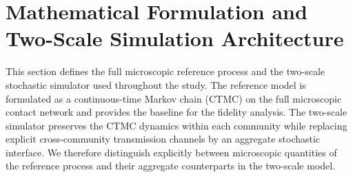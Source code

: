 \documentclass[a4paper,fleqn]{cas-sc}
\newif\ifDEBUG
\begin{document}


\section{Mathematical Formulation and Two-Scale Simulation Architecture}

This section defines the full microscopic reference process and the two-scale stochastic simulator used throughout the study. The reference model is formulated as a continuous-time Markov chain (CTMC) on the full microscopic contact network and provides the baseline for the fidelity analysis. The two-scale simulator preserves the CTMC dynamics within each community while replacing explicit cross-community transmission channels by an aggregate stochastic interface. We therefore distinguish explicitly between microscopic quantities of the reference process and their aggregate counterparts in the two-scale model.
\end{document}
